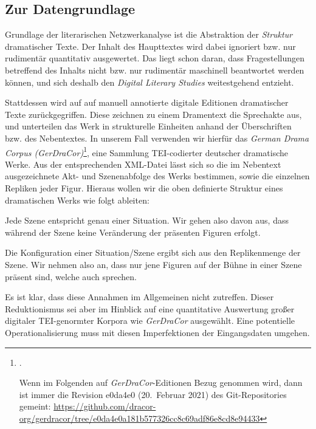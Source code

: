 \documentclass[a4paper,10pt,abstract=true,headings=small]{scrartcl}
\newcommand{\eng}[1]{\textenglish{\emph{#1}}}
\begin{document}
\subsection{Zur Datengrundlage}\label{sec:daten}

Grundlage der literarischen Netzwerkanalyse ist die Abstraktion der \emph{Struktur} dramatischer Texte.
Der Inhalt des Haupttextes wird dabei ignoriert bzw. nur rudimentär quantitativ ausgewertet.
Das liegt schon daran, dass Fragestellungen betreffend des Inhalts nicht bzw. nur rudimentär maschinell beantwortet werden können, und sich deshalb den \eng{Digital Literary Studies} weitestgehend entzieht.\autocite[Vgl.~auch][607]{jannidis_computergestuetzte_2017}

Stattdessen wird auf auf manuell annotierte digitale Editionen dramatischer Texte zurückgegriffen.
Diese zeichnen zu einem Dramentext die Sprechakte aus, und unterteilen das Werk in strukturelle Einheiten anhand der Überschriften bzw. des Nebentextes.
In unserem Fall verwenden wir hierfür das \emph{German Drama Corpus (GerDraCor)}\footnote{\cite{fischer_programmable_2019}.\par Wenn im Folgenden auf \emph{GerDraCor}-Editionen Bezug genommen wird, dann ist immer die Revision e0da4e0 (20.~Februar 2021) des Git-Repositories gemeint: \url{https://github.com/dracor-org/gerdracor/tree/e0da4e0a181b577326cc8c69adf86e8cd8e94433}}, eine Sammlung TEI-codierter deutscher dramatische Werke. %
Aus der entsprechenden XML-Datei lässt sich so die im Nebentext ausgezeichnete Akt- und Szenenabfolge des Werks bestimmen, sowie die einzelnen Repliken jeder Figur.
Hieraus wollen wir die oben definierte Struktur eines dramatischen Werks wie folgt ableiten:
\begin{enumerate*}
    \item Jede Szene entspricht genau einer Situation.
        Wir gehen also davon aus, dass während der Szene keine Veränderung der präsenten Figuren erfolgt.
    \item Die Konfiguration einer Situation/Szene ergibt sich aus den Replikenmenge der Szene. %
        Wir nehmen also an, dass nur jene Figuren auf der Bühne in einer Szene präsent sind, welche auch sprechen.%
\end{enumerate*}

Es ist klar, dass diese Annahmen im Allgemeinen nicht zutreffen.
Dieser Reduktionismus sei aber im Hinblick auf eine quantitative Auswertung großer digitaler TEI-genormter Korpora wie \emph{GerDraCor} ausgewählt.
Eine potentielle Operationalisierung muss mit diesen Imperfektionen der Eingangsdaten umgehen.
\end{document}
